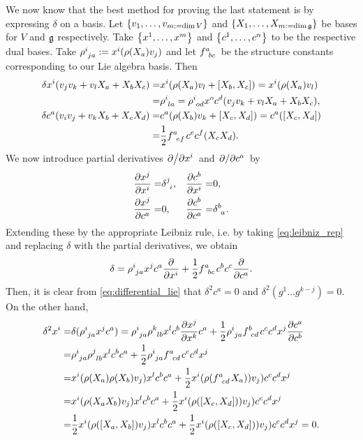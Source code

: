 We now know that the best method for proving the last statement is by expressing $\delta$ on a basis. Let $\qty{v_1,\dots,v_{m:=\dim V}}$ and $\qty{X_1,\dots,X_{m:=\dim\mathfrak{g}}}$ be bases for $V$ and $\mathfrak{g}$ respectively. Take $\qty{x^1,\dots,x^m}$ and $\qty{c^1,\dots,c^n}$ to be the respective dual bases. Take $\rho\indices{^i_{ja}}:=x^i(\rho(X_a)v_j)$ and let $f\indices{^a_{bc}}$ be the structure constants corresponding to our Lie algebra basis. Then
\begin{equation}
\begin{aligned}
\delta x^i(v_j v_k+v_l X_a+X_b X_c)=&x^i(\rho(X_a)v_l+[X_b,X_c])=x^i(\rho(X_a)v_l)\\
=&\rho\indices{^i_{la}}=\rho\indices{^i_{od}}x^oc^d(v_j v_k+v_l X_a+X_b X_c),\\
\delta c^a(v_i v_j+v_k X_b+X_c X_d)=&c^a(\rho(X_b)v_k+[X_c,X_d])=c^a([X_c,X_d])\\
=&\frac{1}{2}f\indices{^a_{ef}}c^ec^f(X_c X_d).
\end{aligned}
\end{equation}
We now introduce partial derivatives $\pdv*{x^i}$ and $\pdv*{c^a}$ by
\begin{equation}
\begin{aligned}
\pdv{x^j}{x^i}=&\delta\indices{^j_i}, & \pdv{c^b}{x^i}=&0,\\
\pdv{x^j}{c^a}=&0, & \pdv{c^b}{c^a}=&\delta\indices{^b_a}.
\end{aligned}
\end{equation}
Extending these by the appropriate Leibniz rule, i.e. by taking \eqref{eq:leibniz_rep} and replacing $\delta$ with the partial derivatives, we obtain
\begin{equation}
\delta=\rho\indices{^i_{ja}}x^jc^a\pdv{x^i}+\frac{1}{2}f\indices{^a_{bc}}c^b c^c\pdv{c^a}.
\end{equation}
Then, it is clear from \eqref{eq:differential_lie} that $\delta^2c^a=0$ and $\delta^2(g^1\dots g^{k-j})=0$. On the other hand, 
\begin{equation}
\begin{aligned}
\delta^2x^i=&\delta(\rho\indices{^i_{ja}}x^jc^a)=\rho\indices{^i_{ja}}\rho\indices{^k_{lb}}x^lc^b\pdv{x^j}{x^k}c^a+\frac{1}{2}\rho\indices{^i_{ja}}f\indices{^b_{cd}}c^cc^dx^j\pdv{c^a}{c^b}\\
=&\rho\indices{^i_{ja}}\rho\indices{^j_{lb}}x^lc^bc^a+\frac{1}{2}\rho\indices{^i_{ja}}f\indices{^a_{cd}}c^cc^dx^j\\
=&x^i(\rho(X_a)\rho(X_b)v_j)x^lc^bc^a+\frac{1}{2}x^i(\rho(f\indices{^a_{cd}}X_a))v_j)c^cc^dx^j\\
=&x^i(\rho(X_aX_b)v_j)x^lc^bc^a+\frac{1}{2}x^i(\rho([X_c,X_d]))v_j)c^cc^dx^j\\
=&\frac{1}{2}x^i(\rho([X_a,X_b])v_j)x^lc^bc^a+\frac{1}{2}x^i(\rho([X_c,X_d]))v_j)c^cc^dx^j=0.\\
\end{aligned}
\end{equation}
